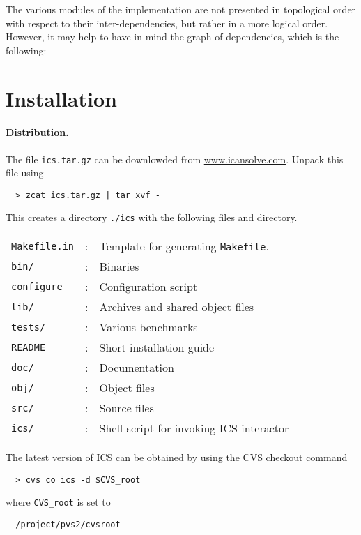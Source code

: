 \documentclass[12pt]{article}
\begin{document}
The various modules of the implementation are not presented in
topological order with respect to their inter-dependencies, but
rather in a more logical order. However, it may help to have in mind
the graph of dependencies, which is the following:


\epsfxsize=15cm
\begin{center}
\end{center}

\epsfxsize=15cm
\begin{center}
\end{center}


\section{Installation}\label{sec:installation}

\paragraph{Distribution.}
The file \texttt{ics.tar.gz} can be downlowded from \url{www.icansolve.com}.
Unpack this file using
  \begin{verbatim}
  > zcat ics.tar.gz | tar xvf -
  \end{verbatim}
This creates a directory \texttt{./ics} with the following files
and directory.\\
  \begin{tabular}{lcl}
   \texttt{Makefile.in}  & : & Template for generating \texttt{Makefile}.  \\
   \texttt{bin/} & : & Binaries \\
   \texttt{configure} & : & Configuration script \\
   \texttt{lib/} & : & Archives and shared object files  \\
   \texttt{tests/} & : & Various benchmarks  \\
   \texttt{README} & : & Short installation guide  \\
   \texttt{doc/} & : & Documentation \\
   \texttt{obj/} & : & Object files \\
   \texttt{src/} & : & Source files \\
   \texttt{ics/} & : & Shell script for invoking ICS interactor\\
  \end{tabular}

The latest version of ICS can be obtained by using the
CVS checkout command
  \begin{verbatim}
  > cvs co ics -d $CVS_root
  \end{verbatim} %
where \texttt{CVS\_root} is set to
  \begin{verbatim}
  /project/pvs2/cvsroot
  \end{verbatim}
\end{document}
